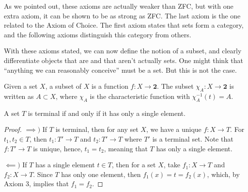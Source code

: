 As we pointed out, these axioms are actually weaker than ZFC, but with one extra axiom,
it can be shown to be as strong as ZFC. The last axiom is the one related to the Axiom of Choice.
The first axiom states that sets form a category, and the following axioms distinguish this
category from others.

With these axioms stated, we can now define the notion of a subset, and clearly
differentiate objects that are and that aren't actually sets.
One might think that ``anything we can reasonably conceive'' must be a set.
But this is not the case.
\begin{definition}[Subset]
    Given a set $X$, a subset of $X$ is a function
    $f:X \to \bm 2$. The subset $\chi_A : X \to \bm 2$ is written
    as $A \subset X$, where $\chi_A$ is the characteristic function
    with $\chi_A^{-1}(t) = A$.
\end{definition}

\begin{corollary}
    A set $T$ is terminal if and only if it has only a single element.
\end{corollary}
\begin{proof}
    $\implies)$ If $T$ is terminal, then for any set $X$, we have a unique $f:X\to T$.
    For $t_1,t_2 \in T$, then $t_1 : T' \to T$ and $t_2: T' \to T$ where $T'$ is a terminal set.
    Note that $f:T' \to T$ is unique, hence, $t_1 = t_2$, meaning that $T$ has only a single element.

    $\impliedby)$ If $T$ has a single element $t \in T$, then for a set $X$, take $f_1 : X \to T$ and
    $f_2 : X \to T$. Since $T$ has only one element, then $f_1(x) = t = f_2(x)$, which, by Axiom 3,
    implies that $f_1 = f_2$.
\end{proof}

